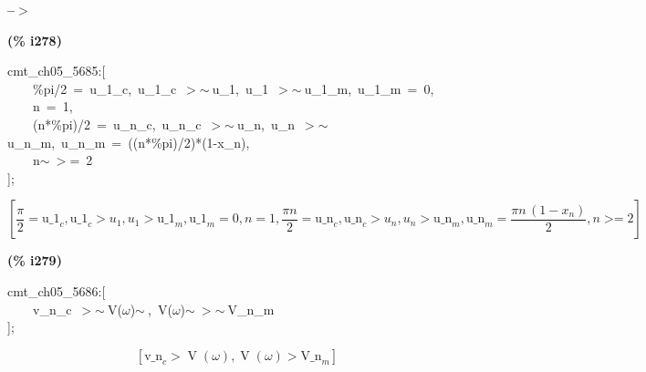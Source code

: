 \documentclass[fleqn]{article}
\begin{document}
\noindent
\begin{minipage}[t]{4.000000em}\color{red}\bfseries
 --\ensuremath{\ensuremath{>}}	
\end{minipage}
\begin{minipage}[t]{\textwidth}\color{blue}

\end{minipage}

\noindent%



\noindent
\begin{minipage}[t]{4.000000em}\color{red}\bfseries
(\% i278)	
\end{minipage}
\begin{minipage}[t]{\textwidth}\color{blue}
cmt\_ch05\_5685:[\\
\ \ \ \ \%pi/2\ =\ u\_1\_c,\ u\_1\_c\ \ensuremath{>}\ensuremath{\sim\ }u\_1,\ u\_1\ \ensuremath{>}\ensuremath{\sim\ }u\_1\_m,\ u\_1\_m\ =\ 0,\\
\ \ \ \ n\ =\ 1,\\
\ \ \ \ (n*\%pi)/2\ =\ u\_n\_c,\ u\_n\_c\ \ensuremath{>}\ensuremath{\sim\ }u\_n,\ u\_n\ \ensuremath{>}\ensuremath{\sim\ }u\_n\_m,\ u\_n\_m\ =\ ((n*\%pi)/2)*(1-x\_n),\\
\ \ \ \ n\ensuremath{\sim\ }\ensuremath{>}=\ 2\\
];
\end{minipage}
\[\displaystyle \tag{\% o278} 
\operatorname{[}\frac{\ensuremath{\pi} }{2}={{\ensuremath{\mathrm{u\_ 1}}}_c}\operatorname{,}{{\ensuremath{\mathrm{u\_ 1}}}_c}\operatorname{>  }{u_1}\operatorname{,}{u_1}\operatorname{>  }{{\ensuremath{\mathrm{u\_ 1}}}_m}\operatorname{,}{{\ensuremath{\mathrm{u\_ 1}}}_m}=0\operatorname{,}n=1\operatorname{,}\frac{\ensuremath{\pi}  n}{2}={{\ensuremath{\mathrm{u\_ n}}}_c}\operatorname{,}{{\ensuremath{\mathrm{u\_ n}}}_c}\operatorname{>  }{u_n}\operatorname{,}{u_n}\operatorname{>  }{{\ensuremath{\mathrm{u\_ n}}}_m}\operatorname{,
}{{\ensuremath{\mathrm{u\_ n}}}_m}=\frac{\ensuremath{\pi}  n\, \left( 1-{x_n}\right) }{2}\operatorname{,}n\operatorname{>  =}2\operatorname{]}\mbox{}
\]


\noindent
\begin{minipage}[t]{4.000000em}\color{red}\bfseries
(\% i279)	
\end{minipage}
\begin{minipage}[t]{\textwidth}\color{blue}
cmt\_ch05\_5686:[\\
\ \ \ \ v\_n\_c\ \ensuremath{>}\ensuremath{\sim\ }V(\ensuremath{\omega})\ensuremath{\sim\ },\ V(\ensuremath{\omega})\ensuremath{\sim\ }\ensuremath{>}\ensuremath{\sim\ }V\_n\_m\\
];
\end{minipage}
\[\displaystyle \tag{\% o279} 
\left[ {{\ensuremath{\mathrm{v\_ n}}}_c}\operatorname{>  }\operatorname{V}\left( \omega \right) \operatorname{,}\operatorname{V}\left( \omega \right) \operatorname{>  }{{\ensuremath{\mathrm{V\_ n}}}_m}\right] \mbox{}
\]
\end{document}
